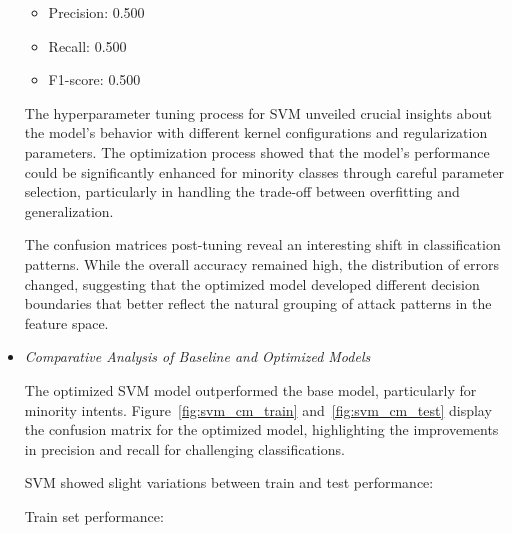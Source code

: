 \begin{itemize}
                    \begin{itemize}
                        \item Precision: 0.500
                        \item Recall: 0.500
                        \item F1-score: 0.500
                    \end{itemize}
                    
                    
                    The hyperparameter tuning process for SVM unveiled crucial insights about the model's behavior with different kernel configurations and regularization parameters. The optimization process showed that the model's performance could be significantly enhanced for minority classes through careful parameter selection, particularly in handling the trade-off between overfitting and generalization.
            
                    The confusion matrices post-tuning reveal an interesting shift in classification patterns. While the overall accuracy remained high, the distribution of errors changed, suggesting that the optimized model developed different decision boundaries that better reflect the natural grouping of attack patterns in the feature space.
                    

                \vspace{0.5em}

                \item \textit{Comparative Analysis of Baseline and Optimized Models}
                
                    \vspace{0.3em}
                    

                    The optimized SVM model outperformed the base model, particularly for minority intents. Figure~\ref{fig:svm_cm_train} and~\ref{fig:svm_cm_test} display the confusion matrix for the optimized model, highlighting the improvements in precision and recall for challenging classifications.
                    
                    
                    SVM showed slight variations between train and test performance:
            
                    Train set performance:
                    

\end{itemize}

